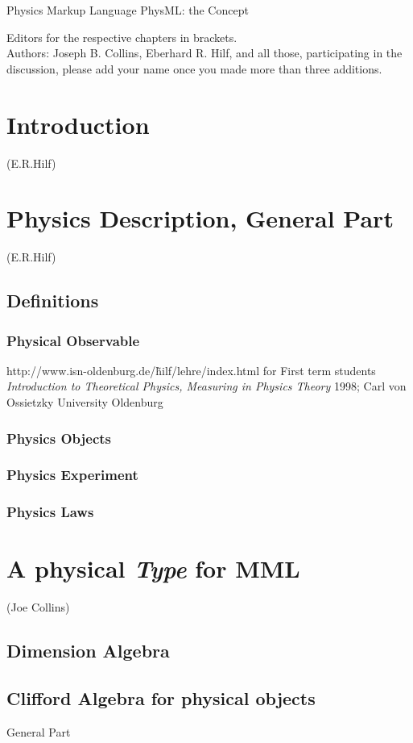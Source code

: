 \documentclass[12pt]{article}
\begin{document}
\centerline{\Large Physics Markup Language PhysML: the Concept} 
Editors for the respective chapters in brackets.
\\

Authors: Joseph B. Collins, Eberhard R. Hilf, and all those, participating in the
discussion, please add your name once you made more than three additions.
\tableofcontents
\newpage 
\section{Introduction}
(E.R.Hilf)

\section{Physics Description, General Part}
(E.R.Hilf)
\subsection{Definitions}
\subsubsection{Physical Observable}
http://www.isn-oldenburg.de/\~hilf/lehre/index.html
for First term students
\textit{Introduction to Theoretical Physics, Measuring in Physics Theory
} 1998; Carl von Ossietzky University Oldenburg
\\


\subsubsection{Physics Objects}
\subsubsection{Physics Experiment}
\subsubsection{Physics Laws}
\section{A physical \textit{Type} for MML}
(Joe Collins) 
\subsection{Dimension Algebra}
\subsection{Clifford Algebra for physical objects}
General Part
\end{document}
